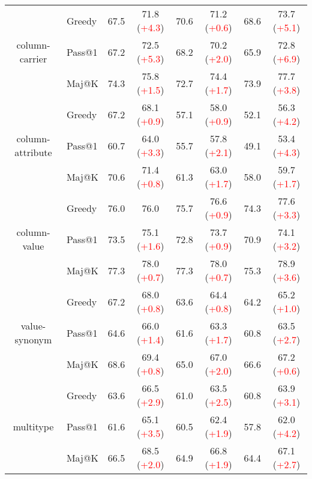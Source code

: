 \begin{table*}[t!]
\begin{adjustbox}{max width=\textwidth}
\begin{tabular}{c | l | c c | c c | c c }
        \multirow{3}{*}{column-carrier} & Greedy & 67.5 & 71.8 (\textcolor{red}{+4.3}) & 70.6 & 71.2 (\textcolor{red}{+0.6}) & 68.6 & 73.7 (\textcolor{red}{+5.1}) \\
        & Pass@1 & 67.2 & 72.5 (\textcolor{red}{+5.3}) & 68.2 & 70.2 (\textcolor{red}{+2.0}) & 65.9 & 72.8 (\textcolor{red}{+6.9}) \\
        & Maj@K & 74.3 & 75.8 (\textcolor{red}{+1.5}) & 72.7 & 74.4 (\textcolor{red}{+1.7}) & 73.9 & 77.7 (\textcolor{red}{+3.8}) \\ \midrule

        \multirow{3}{*}{column-attribute} & Greedy & 67.2 & 68.1 (\textcolor{red}{+0.9}) & 57.1 & 58.0 (\textcolor{red}{+0.9}) & 52.1 & 56.3 (\textcolor{red}{+4.2}) \\
        & Pass@1 & 60.7 & 64.0 (\textcolor{red}{+3.3}) & 55.7 & 57.8 (\textcolor{red}{+2.1}) & 49.1 & 53.4 (\textcolor{red}{+4.3}) \\
        & Maj@K & 70.6 & 71.4 (\textcolor{red}{+0.8}) & 61.3 & 63.0 (\textcolor{red}{+1.7}) & 58.0 & 59.7 (\textcolor{red}{+1.7}) \\
         \midrule 

        \multirow{3}{*}{column-value} & Greedy & 76.0 & 76.0 \phantom{(+0.3)} & 75.7 & 76.6 (\textcolor{red}{+0.9}) & 74.3 & 77.6 (\textcolor{red}{+3.3}) \\
        & Pass@1 & 73.5 & 75.1 (\textcolor{red}{+1.6}) & 72.8 & 73.7 (\textcolor{red}{+0.9}) & 70.9 & 74.1 (\textcolor{red}{+3.2}) \\
        & Maj@K & 77.3 & 78.0 (\textcolor{red}{+0.7}) & 77.3 & 78.0 (\textcolor{red}{+0.7}) & 75.3 & 78.9 (\textcolor{red}{+3.6}) \\
        \midrule

        \multirow{3}{*}{value-synonym} & Greedy & 67.2 & 68.0 (\textcolor{red}{+0.8}) & 63.6 & 64.4 (\textcolor{red}{+0.8}) & 64.2 & 65.2 (\textcolor{red}{+1.0}) \\
        & Pass@1 & 64.6 & 66.0 (\textcolor{red}{+1.4}) & 61.6 & 63.3 (\textcolor{red}{+1.7}) & 60.8 & 63.5 (\textcolor{red}{+2.7}) \\
        & Maj@K & 68.6 & 69.4 (\textcolor{red}{+0.8}) & 65.0 & 67.0 (\textcolor{red}{+2.0}) & 66.6 & 67.2 (\textcolor{red}{+0.6}) \\ \midrule

        \multirow{3}{*}{multitype} & Greedy & 63.6 & 66.5 (\textcolor{red}{+2.9}) & 61.0 & 63.5 (\textcolor{red}{+2.5}) & 60.8 & 63.9 (\textcolor{red}{+3.1}) \\
        & Pass@1 & 61.6 & 65.1 (\textcolor{red}{+3.5}) & 60.5 & 62.4 (\textcolor{red}{+1.9}) & 57.8 & 62.0 (\textcolor{red}{+4.2}) \\
        & Maj@K & 66.5 & 68.5 (\textcolor{red}{+2.0}) & 64.9 & 66.8 (\textcolor{red}{+1.9}) & 64.4 & 67.1 (\textcolor{red}{+2.7}) \\ \midrule
        

\end{tabular}
\end{adjustbox}
\end{table*}
